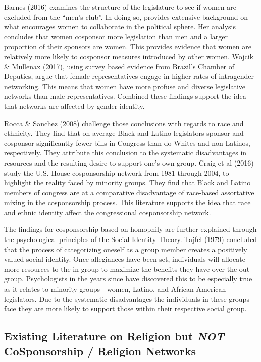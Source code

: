 \documentclass[Royal,times,sageh]{sagej}
\begin{document}
Barnes (2016) examines the structure of the legislature to see if women
are excluded from the ``men's club''. In doing so, provides extensive
background on what encourages women to collaborate in the political
sphere. Her analysis concludes that women cosponsor more legislation
than men and a larger proportion of their sponsors are women. This
provides evidence that women are relatively more likely to cosponsor
measures introduced by other women. Wojcik \& Mullenax (2017), using
survey based evidence from Brazil's Chamber of Deputies, argue that
female representatives engage in higher rates of intragender networking.
This means that women have more profuse and diverse legislative networks
than male representatives. Combined these findings support the idea that
networks are affected by gender identity.

Rocca \& Sanchez (2008) challenge those conclusions with regards to race
and ethnicity. They find that on average Black and Latino legislators
sponsor and cosponsor significantly fewer bills in Congress than do
Whites and non-Latinos, respectively. They attribute this conclusion to
the systematic disadvantages in resources and the resulting desire to
support one's own group. Craig et al (2016) study the U.S. House
cosponsorship network from 1981 through 2004, to highlight the reality
faced by minority groups. They find that Black and Latino members of
congress are at a comparative disadvantage of race-based assortative
mixing in the cosponsorship process. This literature supports the idea
that race and ethnic identity affect the congressional cosponsorship
network.

The findings for cosponsorship based on homophily are further explained
through the psychological principles of the Social Identity Theory.
Tajfel (1979) concluded that the process of categorizing oneself as a
group member creates a positively valued social identity. Once
allegiances have been set, individuals will allocate more resources to
the in-group to maximize the benefits they have over the out-group.
Psychologists in the years since have discovered this to be especially
true as it relates to minority groups - women, Latino, and
African-American legislators. Due to the systematic disadvantages the
individuals in these groups face they are more likely to support those
within their respective social group.

\hypertarget{existing-literature-on-religion-but-not-cosponsorship-religion-networks}{%
\subsection{\texorpdfstring{Existing Literature on Religion but
\emph{NOT} CoSponsorship / Religion
Networks}{Existing Literature on Religion but NOT CoSponsorship / Religion Networks}}\label{existing-literature-on-religion-but-not-cosponsorship-religion-networks}}
\end{document}
